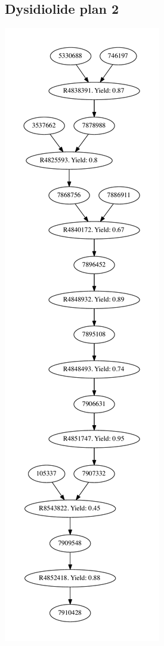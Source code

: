 \documentclass[a4paper,10pt,titlepage]{paper}
\begin{document}
\subsection{Dysidiolide plan 2}
\centering
\includegraphics[scale=0.4]{Synteseplaner/Dysidiolide/plan2.pdf}
\label{Appendix::Dysidiolide2}
\end{document}
